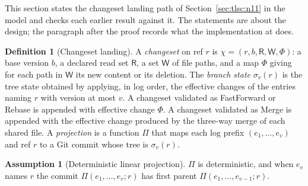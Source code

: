 \documentclass[11pt,letterpaper]{article}
\theoremstyle{definition}
\newtheorem{definition}[theorem]{Definition}
\newtheorem{assumption}[theorem]{Assumption}
\theoremstyle{remark}
\newcommand{\R}{\mathsf{R}}
\newcommand{\W}{\mathsf{W}}
\begin{document}
This section states the changeset landing path of Section~\ref{sec:tlsc:n11} in the model and checks each earlier result against it. The statements are about the design; the paragraph after the proof records what the implementation at  does.

\begin{definition}[Changeset landing]
\label{def:tlsc:changeset}
A \emph{changeset} on ref $r$ is $\chi=(r,b,\R,\W,\Phi)$: a base version $b$, a declared read set $\R$, a set $\W$ of file paths, and a map $\Phi$ giving for each path in $\W$ its new content or its deletion. The \emph{branch state} $\sigma_v(r)$ is the tree state obtained by applying, in log order, the effective changes of the entries naming $r$ with version at most $v$. A changeset validated as FastForward or Rebase is appended with effective change $\Phi$. A changeset validated as Merge is appended with the effective change produced by the three-way merge of each shared file. A \emph{projection} is a function $\Pi$ that maps each log prefix $(e_1,\dots,e_v)$ and ref $r$ to a Git commit whose tree is $\sigma_v(r)$.
\end{definition}

\begin{assumption}[Deterministic linear projection]
\label{ass:tlsc:projection}
$\Pi$ is deterministic, and when $e_v$ names $r$ the commit $\Pi(e_1,\dots,e_v;r)$ has first parent $\Pi(e_1,\dots,e_{v-1};r)$.
\end{assumption}
\end{document}
